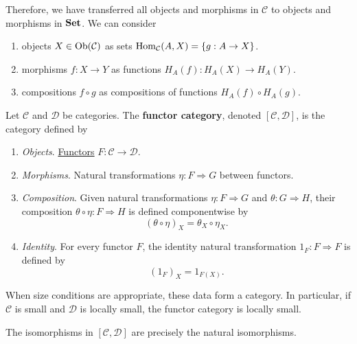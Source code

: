 	Therefore, we have transferred all objects and morphisms in $\mathcal{C}$ to objects and morphisms in $\operatorname{\mathbf{Set}}$. We can consider 
	\begin{enumerate}
		\item objects $X \in \operatorname{Ob}(\mathcal{C})$ as sets $\operatorname{Hom}_{\mathcal{C}}(A, X) = \{g : A \to X\}$.  
		\item morphisms $f: X \to Y$ as functions $H_A (f) : H_A (X) \to H_A (Y)$. 
		\item compositions $f \circ g$ as compositions of functions $H_A (f) \circ H_A (g)$. 
	\end{enumerate}

	\begin{definition}
	  \label{def:functor-category}
		Let $\mathcal C$ and $\mathcal D$ be categories.
		The \textbf{functor category}, denoted
		$[\mathcal C,\mathcal D]$, is the category defined by
		\begin{enumerate}
			\item \textit{Objects}. \hyperref[def:functor]{Functors} $F:\mathcal C\to\mathcal D$.

			\item \textit{Morphisms}. Natural transformations
				$\eta:F\Rightarrow G$ between functors.

			\item \textit{Composition}. Given natural transformations
				$\eta:F\Rightarrow G$ and $\theta:G\Rightarrow H$,
				their composition $\theta\circ\eta:F\Rightarrow H$
				is defined componentwise by
				\begin{equation}
					(\theta\circ\eta)_X=\theta_X\circ\eta_X.
				\end{equation}

			\item \textit{Identity}. For every functor $F$, the
				identity natural transformation $1_F:F\Rightarrow F$
				is defined by
				\begin{equation}
					(1_F)_X=1_{F(X)}.
				\end{equation}
		\end{enumerate}
		When size conditions are appropriate, these data form
		a category. In particular, if $\mathcal C$ is small
		and $\mathcal D$ is locally small, the functor category
		is locally small.

		The isomorphisms in $[\mathcal C,\mathcal D]$ are
		precisely the natural isomorphisms.
	\end{definition}

